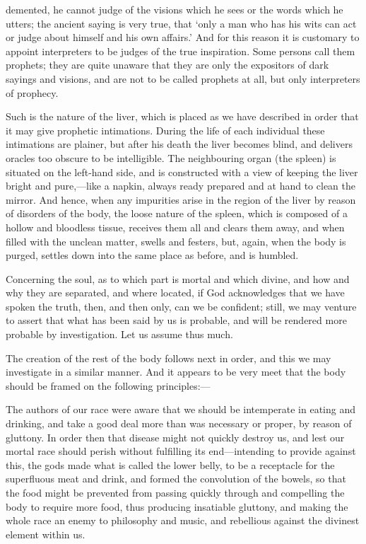 \documentclass[11pt,letter]{article}
\begin{document}
demented, he cannot judge of the visions which he sees or the words which he utters; the ancient saying is very true, that ‘only a man who has his wits can act or judge about himself and his own affairs.’ And for this reason it is customary to appoint interpreters to be judges of the true inspiration. Some persons call them prophets; they are quite unaware that they are only the expositors of dark sayings and visions, and are not to be called prophets at all, but only interpreters of prophecy.

\par  Such is the nature of the liver, which is placed as we have described in order that it may give prophetic intimations. During the life of each individual these intimations are plainer, but after his death the liver becomes blind, and delivers oracles too obscure to be intelligible. The neighbouring organ (the spleen) is situated on the left-hand side, and is constructed with a view of keeping the liver bright and pure,—like a napkin, always ready prepared and at hand to clean the mirror. And hence, when any impurities arise in the region of the liver by reason of disorders of the body, the loose nature of the spleen, which is composed of a hollow and bloodless tissue, receives them all and clears them away, and when filled with the unclean matter, swells and festers, but, again, when the body is purged, settles down into the same place as before, and is humbled.

\par  Concerning the soul, as to which part is mortal and which divine, and how and why they are separated, and where located, if God acknowledges that we have spoken the truth, then, and then only, can we be confident; still, we may venture to assert that what has been said by us is probable, and will be rendered more probable by investigation. Let us assume thus much.

\par  The creation of the rest of the body follows next in order, and this we may investigate in a similar manner. And it appears to be very meet that the body should be framed on the following principles:—

\par  The authors of our race were aware that we should be intemperate in eating and drinking, and take a good deal more than was necessary or proper, by reason of gluttony. In order then that disease might not quickly destroy us, and lest our mortal race should perish without fulfilling its end—intending to provide against this, the gods made what is called the lower belly, to be a receptacle for the superfluous meat and drink, and formed the convolution of the bowels, so that the food might be prevented from passing quickly through and compelling the body to require more food, thus producing insatiable gluttony, and making the whole race an enemy to philosophy and music, and rebellious against the divinest element within us.
\end{document}
